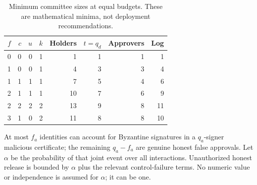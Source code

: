 \documentclass[pdflatex,sn-mathphys-num]{sn-jnl}%
\theoremstyle{plain}
\theoremstyle{definition}
\begin{document}
\begin{table}[htbp]
\caption{Minimum committee sizes at equal budgets. These are mathematical minima, not deployment recommendations.}\label{tab:sensitivity}
\centering\footnotesize\setlength{\tabcolsep}{3.5pt}
\begin{tabular}{@{}rrrrrrrr@{}}\toprule
$f$&$c$&$u$&$k$&Holders&$t=q_d$&Approvers&Log\\\midrule
0&0&0&1&1&1&1&1\\
1&0&0&1&4&3&3&4\\
1&1&1&1&7&5&4&6\\
2&1&1&1&10&7&6&9\\
2&2&2&2&13&9&8&11\\
3&1&0&2&11&8&8&10\\\bottomrule
\end{tabular}
\end{table}




At most $f_a$ identities can account for Byzantine signatures in a $q_a$-signer malicious certificate; the remaining $q_a-f_a$ are genuine honest false approvals. Let $\alpha$ be the probability of that joint event over all interactions. Unauthorized honest release is bounded by $\alpha$ plus the relevant control-failure terms. No numeric value or independence is assumed for $\alpha$; it can be one.
\end{document}
